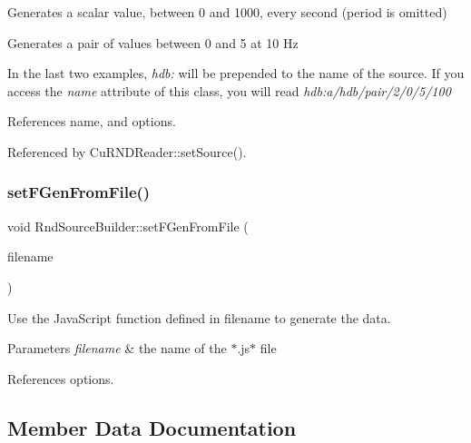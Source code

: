 \begin{DoxyCode}{0}
\end{DoxyCode}


Generates a scalar value, between 0 and 1000, every second (period is omitted)


\begin{DoxyCode}{0}
\end{DoxyCode}


Generates a pair of values between 0 and 5 at 10 Hz

In the last two examples, {\itshape hdb\+:} will be prepended to the name of the source. If you access the {\itshape name} attribute of this class, you will read {\itshape hdb\+:a/hdb/pair/2/0/5/100} 

References name, and options.



Referenced by Cu\+R\+N\+D\+Reader\+::set\+Source().

\mbox{\label{classRndSourceBuilder_a441c7e63a49230a90fd3edc452050a1c}} 
\subsubsection{setFGenFromFile()}
{\footnotesize\ttfamily void Rnd\+Source\+Builder\+::set\+F\+Gen\+From\+File (\begin{DoxyParamCaption}\item[{const Q\+String \&}]{filename }\end{DoxyParamCaption})}



Use the Java\+Script function defined in filename to generate the data. 


\begin{DoxyParams}{Parameters}
{\em filename} & the name of the $\ast$.js$\ast$ file \\
\hline
\end{DoxyParams}


References options.



\subsection{Member Data Documentation}
\mbox{\label{classRndSourceBuilder_aac7fbebb8b5befb75a28f9c8ca96ade8}} 
